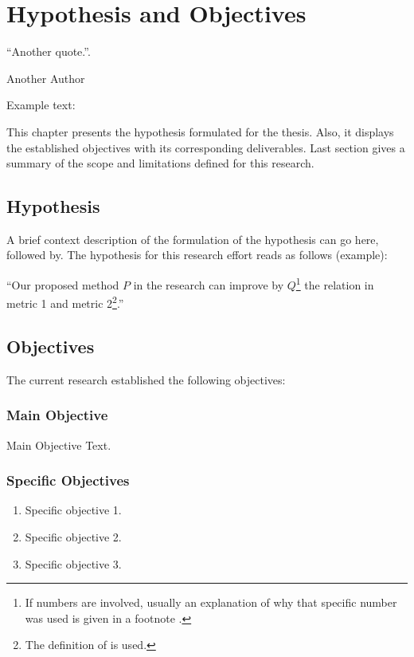 \chapter{Hypothesis and Objectives}
\label{chapter:hypothesis-objectives}
\epigraph{``Another quote.''.}{\vspace{10pt}Another Author}

\newpage
Example text:

This chapter presents the hypothesis formulated for the thesis. Also, it displays the established objectives with its corresponding deliverables. Last section gives a summary of the scope and limitations defined for this research.

\section{Hypothesis}
\label{section:hypothesis}
A brief context description of the formulation of the hypothesis can go here, followed by.
The hypothesis for this research effort reads as follows (example):

``Our proposed method $P$ in the research can improve by $Q$\footnote{If numbers are involved, usually an explanation of why that specific number was used is given in a footnote \cite{examplereference2}.} the relation in metric 1 and metric 2\footnote{The \cite{examplereference} definition of is used.}.''

\section{Objectives}
\label{section:objectives}
The current research established the following objectives:

\subsection{Main Objective}
\label{section:main-objective}
\label{objective:main}
Main Objective Text.

\subsection{Specific Objectives}
\label{section:specific-objectives}

\begin{enumerate}
	\item Specific objective 1.
	
	\item Specific objective 2.
	
	\item Specific objective 3.
	
\end{enumerate}

